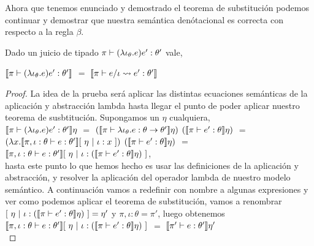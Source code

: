 Ahora que tenemos enunciado y demostrado el teorema de substituci\'on podemos
continuar y demostrar que nuestra sem\'antica den\'otacional es correcta 
con respecto a la regla $\beta$.

\begin{theorem}
Dado un juicio de tipado $\pi \vdash (\lambda \iota_{\theta} . e)e' : \theta'$ vale,

\begin{center}
$\llbracket \pi \vdash (\lambda \iota_{\theta} . e)e' : \theta' \rrbracket$ $=$
$\llbracket \pi \vdash e / \iota \leadsto e' : \theta' \rrbracket$
\end{center}

\end{theorem}
\begin{proof}

La idea de la prueba ser\'a aplicar las distintas ecuaciones sem\'anticas de la aplicaci\'on
y abstracci\'on lambda hasta llegar el punto de poder aplicar nuestro teorema de susbtituci\'on.
Supongamos un $\eta$ cualquiera,\\

$\llbracket \pi \vdash (\lambda \iota_{\theta} . e)e' : \theta' \rrbracket\eta$ $=$
$(\llbracket \pi \vdash \lambda \iota_{\theta} . e : \theta \rightarrow \theta' \rrbracket\eta)$
$(\llbracket \pi \vdash e' : \theta \rrbracket\eta)$ $=$\\

$(\lambda x . \llbracket \pi,\iota:\theta \vdash e : \theta' \rrbracket[ \ \eta \ | \ \iota:x \ ])$
$(\llbracket \pi \vdash e' : \theta \rrbracket\eta)$ $=$\\

$\semBrcks{\pi,\iota:\theta \vdash e : \theta'}[ \ \eta \ | \ 
	\iota:(\semBrcks{\pi \vdash e' : \theta}\eta) \ ]$,\\
												
hasta este punto lo que hemos hecho es usar las definiciones de la aplicaci\'on
y abstracci\'on, y resolver la aplicaci\'on del operador lambda de nuestro
modelo sem\'antico. A continuaci\'on vamos a redefinir con nombre a algunas 
expresiones y ver como podemos aplicar el teorema de substituci\'on, vamos
a renombrar $[ \ \eta \ | \ \iota:(\llbracket \pi \vdash e' : \theta \rrbracket\eta) \ ] = \eta'$
y $\pi,\iota:\theta = \pi'$, luego obtenemos\\

$\semBrcks{\pi,\iota:\theta \vdash e : \theta'}[ \ \eta \ | \ 
	\iota:(\semBrcks{\pi \vdash e' : \theta}\eta) \ ]$ $=$ $\llbracket \pi' \vdash e : \theta' \rrbracket\eta'$\\


\end{proof}
